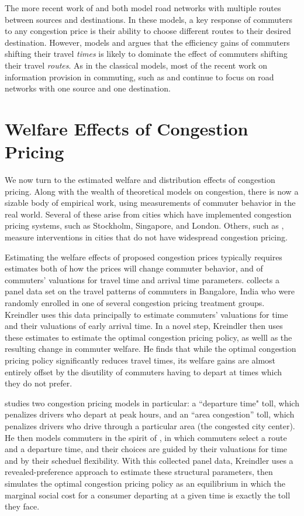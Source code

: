 \documentclass[JEL]{AEA}
\begin{document}
The more recent work of \cite{das-2017} and \cite{ostrovsky-2018} both model road networks with multiple routes between sources and destinations. In these models, a key response of commuters to any congestion price is their ability to choose different routes to their desired destination. However, \cite{arnott-1990} models and argues that the efficiency gains of commuters shifting their travel \emph{times} is likely to dominate the effect of commuters shifting their travel \emph{routes}. As in the classical models, most of the recent work on information provision in commuting, such as \cite{das-2017} and \cite{acemoglu-2016} continue to focus on road networks with one source and one destination.

\section{Welfare Effects of Congestion Pricing}
\label{welfare-effects}

We now turn to the estimated welfare and distribution effects of congestion pricing. Along with the wealth of theoretical models on congestion, there is now a sizable body of empirical work, using measurements of commuter behavior in the real world. Several of these arise from cities which have implemented congestion pricing systems, such as Stockholm, Singapore, and London. Others, such as \cite{kreindler-2018}, measure interventions in cities that do not have widespread congestion pricing.

Estimating the welfare effects of proposed congestion prices typically requires estimates both of how the prices will change commuter behavior, and of commuters' valuations for travel time and arrival time parameters. \cite{kreindler-2018} collects a panel data set on the travel patterns of commuters in Bangalore, India who were randomly enrolled in one of several congestion pricing treatment groups. Kreindler uses this data principally to estimate commuters' valuations for time and their valuations of early arrival time. In a novel step, Kreindler then uses these estimates to estimate the optimal congestion pricing policy, as welll as the resulting change in commuter welfare. He finds that while the optimal congestion pricing policy significantly reduces travel times, its welfare gains are almost entirely offset by the disutility of commuters having to depart at times which they do not prefer.

\cite{kreindler-2018} studies two congestion pricing models in particular: a ``departure time" toll, which penalizes drivers who depart at peak hours, and an ``area congestion'' toll, which penalizes drivers who drive through a particular area (the congested city center). He then models commuters in the spirit of \cite{arnott-1994}, in which commuters select a route and a departure time, and their choices are guided by their valuations for time and by their scheduel flexibility. With this collected panel data, Kreindler uses a revealed-preference approach to estimate these structural parameters, then simulates the optimal congestion pricing policy as an equilibrium in which the marginal social cost for a consumer departing at a given time is exactly the toll they face.
\end{document}
